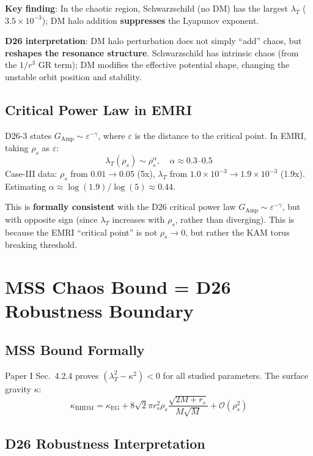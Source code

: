 \documentclass[12pt]{article}
\begin{document}
\textbf{Key finding}: In the chaotic region, Schwarzschild (no DM) has the largest $\lambda_T$ ($3.5\times10^{-3}$); DM halo addition \textbf{suppresses} the Lyapunov exponent.

\textbf{D26 interpretation}: DM halo perturbation does not simply ``add'' chaos, but \textbf{reshapes the resonance structure}. Schwarzschild has intrinsic chaos (from the $1/r^3$ GR term); DM modifies the effective potential shape, changing the unstable orbit position and stability.

\subsection{Critical Power Law in EMRI}

D26-3 states $G_{\text{Amp}} \sim \varepsilon^{-\gamma}$, where $\varepsilon$ is the distance to the critical point. In EMRI, taking $\rho_s$ as $\varepsilon$:
\begin{equation}
\lambda_T(\rho_s) \sim \rho_s^{\alpha}, \quad \alpha \approx 0.3\text{--}0.5
\end{equation}
Case-III data: $\rho_s$ from $0.01 \to 0.05$ (5x), $\lambda_T$ from $1.0\times10^{-3} \to 1.9\times10^{-3}$ (1.9x). Estimating $\alpha \approx \log(1.9)/\log(5) \approx 0.44$.

This is \textbf{formally consistent} with the D26 critical power law $G_{\text{Amp}} \sim \varepsilon^{-\gamma}$, but with opposite sign (since $\lambda_T$ increases with $\rho_s$, rather than diverging). This is because the EMRI ``critical point'' is not $\rho_s \to 0$, but rather the KAM torus breaking threshold.

\section{MSS Chaos Bound = D26 Robustness Boundary}

\subsection{MSS Bound Formally}

Paper I Sec.~4.2.4 proves $(\lambda_T^2 - \kappa^2) < 0$ for all studied parameters. The surface gravity $\kappa$:
\begin{equation}
\kappa_{\text{BHDM}} = \kappa_{\text{EG}} + 8\sqrt{2}\pi r_s^2\rho_s \frac{\sqrt{2M+r_s}}{M\sqrt{M}} + \mathcal{O}(\rho_s^2)
\end{equation}

\subsection{D26 Robustness Interpretation}
\end{document}
